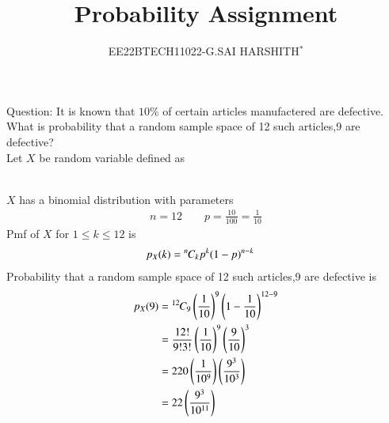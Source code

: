 \documentclass[journal,12pt,twocolumn]{IEEEtran}
\theoremstyle{remark}
\begin{document}

\vspace{3cm}

\title{Probability Assignment}
\author{EE22BTECH11022-G.SAI HARSHITH$^{*}$%
}
\maketitle
\newpage
\bigskip
\renewcommand{\thefigure}{\theenumi}
\renewcommand{\thetable}{\theenumi}

Question: It is known that $10\%$ of certain articles manufactered are defective. What is probability that a random sample space of 12 such articles,9 are defective?\\
\solution
Let $X$ be random variable defined as
\begin{table}[!ht]
	
\end{table}\\
$X$ has a binomial distribution with parameters
\begin{align}
n=12 \qquad p=\frac{10}{100}=\frac{1}{10}
\end{align}
Pmf of $X$ for $1 \leq k \leq 12$ is
\begin{align}
p_X(k)&={{}^{n}\mkern-1muC_{k}}p^k(1-p)^{n-k}
\end{align}
Probability that a random sample space of 12 such articles,9 are defective is
\begin{align}
p_X(9)&={{}^{12}\mkern-1muC_{9}}\left(\frac{1}{10}\right)^9\left(1-\frac{1}{10}\right)^{12-9}\\
&=\frac{12!}{9!3!}\left(\frac{1}{10}\right)^9\left(\frac{9}{10}\right)^{3}\\
&=220\left(\frac{1}{10^9}\right)\left(\frac{9^3}{10^3}\right)\\
&=22\left(\frac{9^3}{10^{11}}\right)
\end{align}
\end{document}
